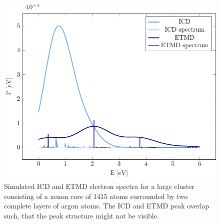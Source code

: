 \begin{figure}[h]
 \centering
 \includegraphics[scale=0.7]{pics/xe_8_1lay.pdf}
 \caption{Simulated ICD and ETMD electron spectra for a large cluster consisting
          of a xenon core of 1415 atoms surrounded by two complete layers of
          argon atoms. The ICD and ETMD peak overlap such, that the peak structure
          might not be visible.}
 \label{figure:xe_8_lay1}
\end{figure}
